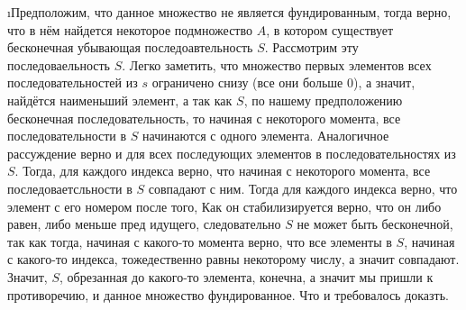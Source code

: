 \i Предположим, что данное множество не является фундированным, тогда верно, что в нём найдется некоторое подмножество $A$, в котором существует бесконечная убывающая последоавтельность $S$. Рассмотрим эту последоваельность $S$. Легко заметить, что множество первых элементов всех последовательностей из $s$ ограничено снизу (все они больше 0), а значит, найдётся наименьший элемент, а так как $S$, по нашему предположению бесконечная последовательность, то начиная с некоторого момента, все последовательности в $S$ начинаются с одного элемента. Аналогичное рассуждение верно и для всех последующих элементов в последовательностях из $S$. Тогда, для каждого индекса верно, что начиная с некоторого момента, все последоваетсльности в $S$ совпадают с ним. Тогда для каждого индекса верно, что элемент с его номером после того, Как он стабилизируется верно, что он либо равен, либо меньше пред идущего, следовательно $S$ не может быть бесконечной, так как тогда, начиная с какого-то момента верно, что все элементы в $S$, начиная с какого-то индекса, тожедественно равны некоторому числу, а значит совпадают. Значит, $S$, обрезанная до какого-то элемента, конечна, а значит мы пришли к противоречию, и данное множество фундированное. Что и требовалось доказть.